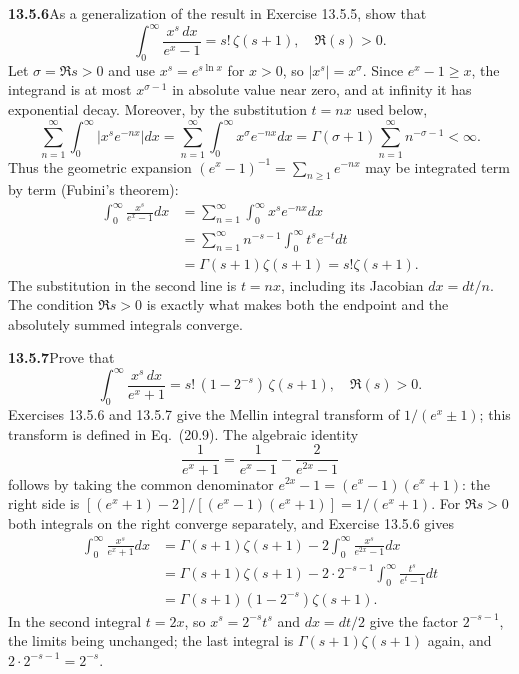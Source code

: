 \par\bigskip
\noindent\textbf{13.5.6}\quad As a generalization of the result in Exercise
13.5.5, show that
\[
\int_{0}^{\infty}\frac{x^{s}\,dx}{e^{x}-1}=s!\,\zeta(s+1),
\quad\Re(s)>0.
\]
\solution
Let $\sigma=\Re s>0$ and use $x^s=e^{s\ln x}$ for $x>0$, so
$|x^s|=x^\sigma$.  Since $e^x-1\ge x$, the integrand is at most
$x^{\sigma-1}$ in absolute value near zero, and at infinity it
has exponential decay.  Moreover, by the substitution $t=nx$ used
below,
\[
\sum_{n=1}^{\infty}\int_0^\infty|x^se^{-nx}|dx
=\sum_{n=1}^{\infty}\int_0^\infty x^\sigma e^{-nx}dx
=\Gamma(\sigma+1)\sum_{n=1}^{\infty}n^{-\sigma-1}<\infty.
\]
Thus the geometric expansion $(e^x-1)^{-1}=\sum_{n\ge1}e^{-nx}$
may be integrated term by term (Fubini's theorem):
\begin{align*}
\int_0^\infty\frac{x^s}{e^x-1}dx
&=\sum_{n=1}^{\infty}\int_0^\infty x^se^{-nx}dx\\
&=\sum_{n=1}^{\infty}n^{-s-1}
\int_0^\infty t^se^{-t}dt\\
&=\boxed{\Gamma(s+1)\zeta(s+1)=s!\zeta(s+1)}.
\end{align*}
The substitution in the second line is $t=nx$, including its
Jacobian $dx=dt/n$.  The condition $\Re s>0$ is exactly what
makes both the endpoint and the absolutely summed integrals
converge.


\par\bigskip
\noindent\textbf{13.5.7}\quad Prove that
\[
\int_{0}^{\infty}\frac{x^{s}\,dx}{e^{x}+1}
=s!\,(1-2^{-s})\,\zeta(s+1),\quad\Re(s)>0.
\]
Exercises 13.5.6 and 13.5.7 give the Mellin integral transform of
$1/(e^{x}\pm1)$; this transform is defined in Eq.~(20.9).
\solution
The algebraic identity
\[
\frac1{e^x+1}=\frac1{e^x-1}-\frac2{e^{2x}-1}
\]
follows by taking the common denominator
$e^{2x}-1=(e^x-1)(e^x+1)$: the right side is
$[(e^x+1)-2]/[(e^x-1)(e^x+1)]=1/(e^x+1)$.  For $\Re s>0$ both
integrals on the right converge separately, and Exercise 13.5.6
gives
\begin{align*}
\int_0^\infty\frac{x^s}{e^x+1}dx
&=\Gamma(s+1)\zeta(s+1)
-2\int_0^\infty\frac{x^s}{e^{2x}-1}dx\\
&=\Gamma(s+1)\zeta(s+1)
-2\cdot2^{-s-1}\int_0^\infty\frac{t^s}{e^t-1}dt\\
&=\boxed{\Gamma(s+1)(1-2^{-s})\zeta(s+1)}.
\end{align*}
In the second integral $t=2x$, so $x^s=2^{-s}t^s$ and $dx=dt/2$
give the factor $2^{-s-1}$, the limits being unchanged; the last
integral is $\Gamma(s+1)\zeta(s+1)$ again, and
$2\cdot2^{-s-1}=2^{-s}$.

